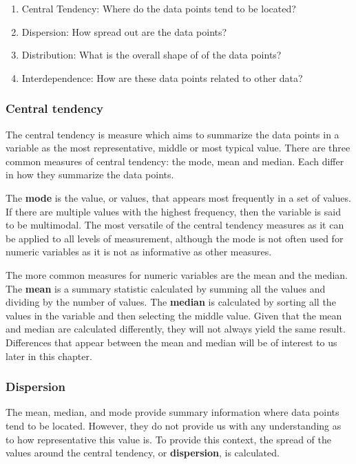 \documentclass[
  letterpaper,
  DIV=11,
  numbers=noendperiod]{scrreport}
\providecommand{\tightlist}{%
  \setlength{\itemsep}{0pt}\setlength{\parskip}{0pt}}\usepackage{longtable,booktabs,array}
\theoremstyle{definition}
\theoremstyle{remark}
\begin{document}
\begin{enumerate}
\def\labelenumi{\arabic{enumi}.}
\tightlist
\item
  Central Tendency: Where do the data points tend to be located?
\item
  Dispersion: How spread out are the data points?
\item
  Distribution: What is the overall shape of of the data points?
\item
  Interdependence: How are these data points related to other data?
\end{enumerate}

\hypertarget{sec-aa-central-tendency}{%
\subsubsection{Central tendency}\label{sec-aa-central-tendency}}

The central tendency is measure which aims to summarize the data points
in a variable as the most representative, middle or most typical value.
There are three common measures of central tendency: the mode, mean and
median. Each differ in how they summarize the data points.

The \textbf{mode} is the value, or values, that appears most frequently
in a set of values. If there are multiple values with the highest
frequency, then the variable is said to be multimodal. The most
versatile of the central tendency measures as it can be applied to all
levels of measurement, although the mode is not often used for numeric
variables as it is not as informative as other measures.

The more common measures for numeric variables are the mean and the
median. The \textbf{mean} is a summary statistic calculated by summing
all the values and dividing by the number of values. The \textbf{median}
is calculated by sorting all the values in the variable and then
selecting the middle value. Given that the mean and median are
calculated differently, they will not always yield the same result.
Differences that appear between the mean and median will be of interest
to us later in this chapter.

\hypertarget{dispersion}{%
\subsubsection{Dispersion}\label{dispersion}}

The mean, median, and mode provide summary information where data points
tend to be located. However, they do not provide us with any
understanding as to how representative this value is. To provide this
context, the spread of the values around the central tendency, or
\textbf{dispersion}, is calculated.
\end{document}
